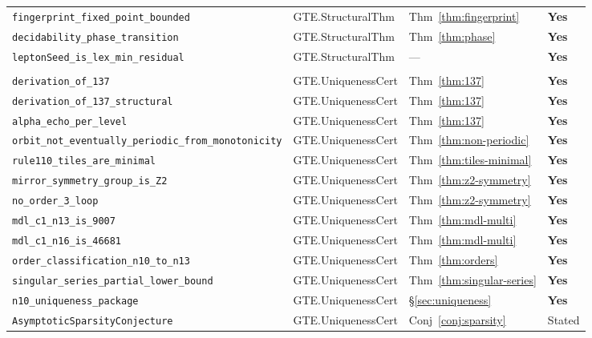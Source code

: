 \begin{longtable}{@{}p{6.3cm}p{4.6cm}p{1.5cm}p{1.5cm}@{}}
\lstinline|fingerprint_fixed_point_bounded|& GTE.StructuralThm & Thm~\ref{thm:fingerprint}  & \textbf{Yes} \\
\lstinline|decidability_phase_transition| & GTE.StructuralThm & Thm~\ref{thm:phase}        & \textbf{Yes} \\
\lstinline|leptonSeed_is_lex_min_residual|& GTE.StructuralThm & ---                        & \textbf{Yes} \\
\addlinespace[4pt]
\midrule
\addlinespace[2pt]
\multicolumn{4}{@{}l}{\textit{Uniqueness Certificates (\S\ref{sec:uniqueness})}} \\
\addlinespace[2pt]
\lstinline|derivation_of_137|                 & GTE.UniquenessCert & Thm~\ref{thm:137}            & \textbf{Yes} \\
\lstinline|derivation_of_137_structural|      & GTE.UniquenessCert & Thm~\ref{thm:137}            & \textbf{Yes} \\
\lstinline|alpha_echo_per_level|              & GTE.UniquenessCert & Thm~\ref{thm:137}            & \textbf{Yes} \\
\lstinline|orbit_not_eventually_periodic_from_monotonicity| & GTE.UniquenessCert & Thm~\ref{thm:non-periodic}   & \textbf{Yes} \\
\lstinline|rule110_tiles_are_minimal|         & GTE.UniquenessCert & Thm~\ref{thm:tiles-minimal}  & \textbf{Yes} \\
\lstinline|mirror_symmetry_group_is_Z2|       & GTE.UniquenessCert & Thm~\ref{thm:z2-symmetry}    & \textbf{Yes} \\
\lstinline|no_order_3_loop|                   & GTE.UniquenessCert & Thm~\ref{thm:z2-symmetry}    & \textbf{Yes} \\
\lstinline|mdl_c1_n13_is_9007|               & GTE.UniquenessCert & Thm~\ref{thm:mdl-multi}      & \textbf{Yes} \\
\lstinline|mdl_c1_n16_is_46681|              & GTE.UniquenessCert & Thm~\ref{thm:mdl-multi}      & \textbf{Yes} \\
\lstinline|order_classification_n10_to_n13|  & GTE.UniquenessCert & Thm~\ref{thm:orders}         & \textbf{Yes} \\
\texttt{singular\_series\_partial\_\allowbreak lower\_bound} & GTE.UniquenessCert & Thm~\ref{thm:singular-series} & \textbf{Yes} \\ %
\lstinline|n10_uniqueness_package|            & GTE.UniquenessCert & \S\ref{sec:uniqueness}       & \textbf{Yes} \\
\lstinline|AsymptoticSparsityConjecture|      & GTE.UniquenessCert & Conj~\ref{conj:sparsity}     & Stated \\

\end{longtable}
